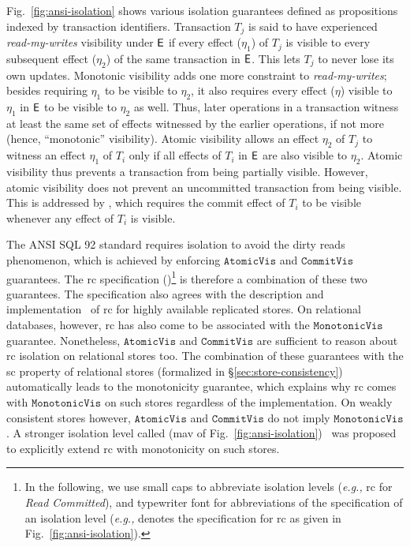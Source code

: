 Fig.~\ref{fig:ansi-isolation} shows various isolation guarantees
defined as propositions indexed by transaction identifiers.
Transaction $T_j$ is said to have experienced \emph{read-my-writes}
visibility under $\textsf{E}$ if every effect ($\eta_1$) of $T_j$ is visible
to every subsequent effect ($\eta_2$) of the same transaction in $\textsf{E}$.
This lets $T_j$ to never lose its own updates. Monotonic visibility
adds one more constraint to \emph{read-my-writes}; besides requiring $\eta_1$
to be visible to $\eta_2$, it also requires every effect ($\eta$)
visible to $\eta_1$ in $\textsf{E}$ to be visible to $\eta_2$ as well. Thus,
later operations in a transaction witness at least the same set of
effects witnessed by the earlier operations, if not more (hence,
``monotonic'' visibility). Atomic visibility allows an effect
$\eta_2$ of $T_j$ to witness an effect $\eta_1$ of $T_i$ only if all
effects of $T_i$ in $\textsf{E}$ are also visible to $\eta_2$. Atomic
visibility thus prevents a transaction from being partially visible.
However, atomic visibility does not prevent an uncommitted transaction
from being visible. This is addressed by , which requires
the commit effect of $T_i$ to be visible whenever any effect of $T_i$
is visible.

The ANSI SQL 92 standard requires  isolation to
avoid the dirty reads phenomenon, which is achieved by enforcing
$\mathtt{AtomicVis}$ and $\mathtt{CommitVis}$ guarantees. The {\sc rc}
specification ()\footnote{In the following, we use small caps to abbreviate
  isolation levels (\emph{e.g.,} {\sc rc} for \emph{Read Committed}), and
  typewriter font for abbreviations of the specification of an isolation
  level (\emph{e.g.,}  denotes the specification for {\sc rc} as
  given in Fig.~\ref{fig:ansi-isolation}).} is therefore a combination of these two
guarantees. The specification also agrees with the description and
implementation~\cite{bailishat,pldi15} of {\sc rc} for highly
available replicated stores. On relational databases, however, {\sc
rc} has also come to be associated with the $\mathtt{MonotonicVis}$
guarantee.  Nonetheless, $\mathtt{AtomicVis}$ and $\mathtt{CommitVis}$
are sufficient to reason about {\sc rc} isolation on relational stores
too. The combination of these guarantees with the {\sc sc} property of
relational stores (formalized in \S\ref{sec:store-consistency})
automatically leads to the monotonicity guarantee, which explains why
{\sc rc} comes with $\mathtt{MonotonicVis}$ on such stores regardless
of the implementation. On weakly consistent stores however,
$\mathtt{AtomicVis}$ and $\mathtt{CommitVis}$ do not imply
$\mathtt{MonotonicVis}$. A stronger isolation level called
 ({\sc mav} of
Fig.~\ref{fig:ansi-isolation})~\cite{bailishat} was proposed to
explicitly extend {\sc rc} with monotonicity on such stores. 


